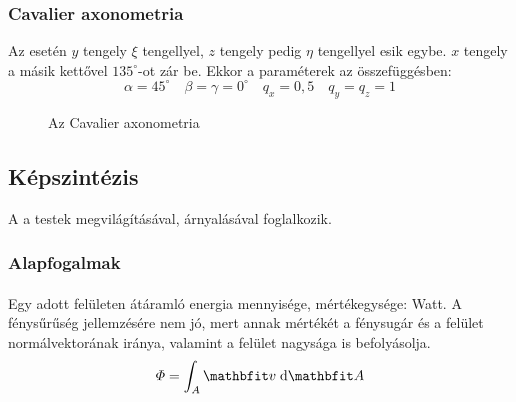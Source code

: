 \documentclass[../../main.tex]{subfiles}
\begin{document}
\subsubsection{Cavalier axonometria}

Az  esetén $y$ tengely $\xi$ tengellyel, $z$ tengely
pedig $\eta$ tengellyel esik egybe. $x$ tengely a másik kettővel $135^\circ$-ot
zár be. Ekkor a paraméterek az összefüggésben:
\[
  \alpha = 45^\circ
  \quad
  \beta = \gamma = 0^\circ
  \quad
  q_x = 0,5
  \quad
  q_y = q_z = 1
\]
\begin{figure}[H]
  \centering
  \caption{Az Cavalier axonometria}
  \label{fig:cavalier}
\end{figure}

\subsection{Képszintézis}

A  a testek megvilágításával, árnyalásával foglalkozik.

\subsubsection{Alapfogalmak}

\paragraph*{}
Egy adott felületen átáramló energia mennyisége, mértékegysége: Watt.
A fénysűrűség jellemzésére nem jó, mert annak mértékét a fénysugár és a felület
normálvektorának iránya, valamint a felület nagysága is befolyásolja.
\[
  \varPhi = \int_{A} \rvec v \; \dd \rvec A
\]
\end{document}
